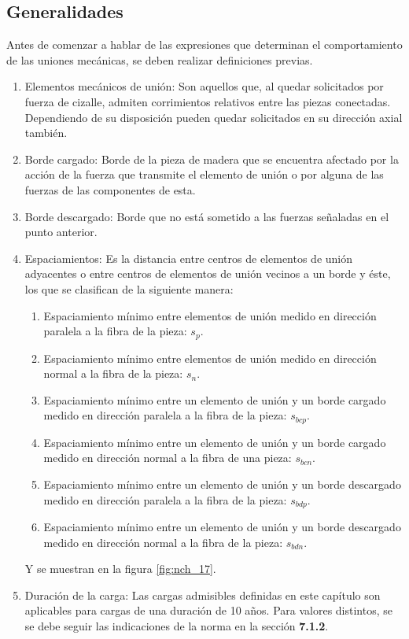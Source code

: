\subsection{Generalidades}
Antes de comenzar a hablar de las expresiones que determinan el comportamiento de las uniones mecánicas, se deben realizar definiciones previas. 
\begin{enumerate}
		\item Elementos mecánicos de unión: Son aquellos que, al quedar solicitados por fuerza de cizalle, admiten corrimientos relativos entre las piezas conectadas. Dependiendo de su disposición pueden quedar solicitados en su dirección axial también.
		\item Borde cargado: Borde de la pieza de madera que se encuentra afectado por la acción de la fuerza que transmite el elemento de unión o por alguna de las fuerzas de las componentes de esta.
		\item Borde descargado: Borde que no está sometido a las fuerzas señaladas en el punto anterior.
		\item Espaciamientos: Es la distancia entre centros de elementos de unión adyacentes o entre centros de elementos de unión vecinos a un borde y éste, los que se clasifican de la siguiente manera:
		\begin{enumerate}
			\item Espaciamiento mínimo entre elementos de unión medido en dirección paralela a la fibra de la pieza: $s_p$.
			\item Espaciamiento mínimo entre elementos de unión medido en dirección normal a la fibra de la pieza: $s_n$.
			\item Espaciamiento mínimo entre un elemento de unión y un borde cargado medido en dirección paralela a la fibra de la pieza: $s_{bcp}$.
			\item Espaciamiento mínimo entre un elemento de unión y un borde cargado medido en dirección normal a la fibra de una pieza: $s_{bcn}$.
			\item Espaciamiento mínimo entre un elemento de unión y un borde descargado medido en dirección paralela a la fibra de la pieza: $s_{bdp}$.
			\item Espaciamiento mínimo entre un elemento de unión y un borde descargado medido en dirección normal a la fibra de la pieza: $s_{bdn}$.
		\end{enumerate}
		Y se muestran en la figura \ref{fig:nch_17}.
		\item Duración de la carga: Las cargas admisibles definidas en este capítulo son aplicables para cargas de una duración de 10 años. Para valores distintos, se se debe seguir las indicaciones de la norma en la sección \textbf{7.1.2}.

\end{enumerate}
